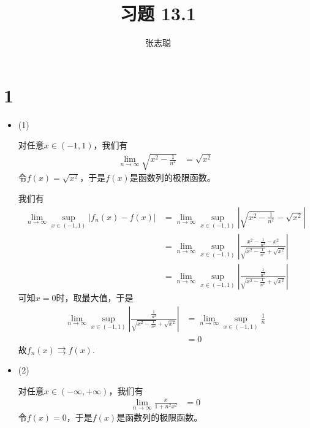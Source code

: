 \documentclass{article}
\begin{document}
\title{习题 13.1}
\author{张志聪}
\maketitle

\section*{1}
\begin{itemize}
  \item (1)

        对任意$x \in (-1, 1)$，我们有
        \begin{align*}
          \lim\limits_{n \to \infty} \sqrt{x^2 - \frac{1}{n^2}}
           & = \sqrt{x^2}
        \end{align*}
        令$f(x) = \sqrt{x^2}$，于是$f(x)$是函数列的极限函数。

        我们有
        \begin{align*}
          \lim\limits_{n \to \infty} \sup\limits_{x \in (-1, 1)} |f_n(x) - f(x)|
           & = \lim\limits_{n \to \infty} \sup\limits_{x \in (-1, 1)} \left|\sqrt{x^2 - \frac{1}{n^2}} - \sqrt{x^2}\right|                                   \\
           & = \lim\limits_{n \to \infty} \sup\limits_{x \in (-1, 1)} \left|\frac{x^2 - \frac{1}{n^2} - x^2}{\sqrt{x^2 - \frac{1}{n^2}} + \sqrt{x^2}}\right| \\
           & = \lim\limits_{n \to \infty} \sup\limits_{x \in (-1, 1)} \left|\frac{\frac{1}{n^2}}{\sqrt{x^2 - \frac{1}{n^2}} + \sqrt{x^2}}\right|
        \end{align*}
        可知$x = 0$时，取最大值，于是
        \begin{align*}
          \lim\limits_{n \to \infty} \sup\limits_{x \in (-1, 1)} \left|\frac{\frac{1}{n^2}}{\sqrt{x^2 - \frac{1}{n^2}} + \sqrt{x^2}}\right|
           & = \lim\limits_{n \to \infty} \sup\limits_{x \in (-1, 1)} \frac{1}{n} \\
           & = 0
        \end{align*}
        故$f_n(x) \rightrightarrows f(x)$.

  \item (2)

        对任意$x \in (-\infty, +\infty)$，我们有
        \begin{align*}
          \lim\limits_{n \to \infty} \frac{x}{1 + n^2x^2}
           & = 0
        \end{align*}
        令$f(x) = 0$，于是$f(x)$是函数列的极限函数。


\end{itemize}
\end{document}
